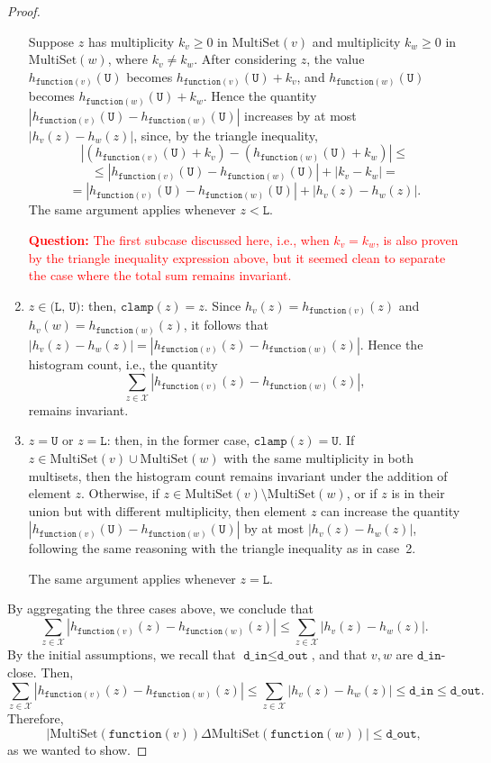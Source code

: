 \documentclass[11pt,a4paper]{article}
\theoremstyle{definition}
\newcommand{\MultiSet}{\mathrm{MultiSet}}
\newcommand{\din}{\texttt{d\_in}}
\newcommand{\dout}{\texttt{d\_out}}
\newcommand{\clamp}{\texttt{clamp}}
\newcommand{\function}{\texttt{function}}
\newcommand{\questionc}[1]{\textcolor{red}{\textbf{Question:} #1}}
\newcommand{\silvia}[1]{{ {\color{blue}{(silvia)~#1}}}}
\begin{document}
\begin{proof}
\begin{enumerate}
    Suppose $z$ has multiplicity $k_v \geq 0$ in $\MultiSet(v)$ and multiplicity $k_w \geq 0$ in $\MultiSet(w)$, where $k_v \neq k_w$. After considering $z$, the value $h_{\function(v)}(\texttt{U})$ becomes $h_{\function(v)}(\texttt{U}) + k_v$, and $h_{\function(w)}(\texttt{U})$ becomes $h_{\function(w)}(\texttt{U}) + k_w$. Hence the quantity $|h_{\function(v)}(\texttt{U}) - h_{\function(w)}(\texttt{U})|$ increases by at most $|h_v(z) - h_w(z)|$, since, by the triangle inequality,
    \[
         |(h_{\function(v)}(\texttt{U}) + k_v) - (h_{\function(w)}(\texttt{U}) + k_w)| \leq
    \]
    \[
         \leq |h_{\function(v)}(\texttt{U}) - h_{\function(w)}(\texttt{U})| + |k_v - k_w| =
    \]
    \[
        = |h_{\function(v)}(\texttt{U}) - h_{\function(w)}(\texttt{U})| + |h_v(z) - h_w(z)|.
    \]
    The same argument applies whenever $z < \texttt{L}$. 
    
    \questionc{The first subcase discussed here, i.e., when $k_v = k_w$, is also proven by the triangle inequality expression above, but it seemed clean to separate the case where the total sum remains invariant.}
    
    \item $z \in \texttt{(L, U)}$: then, $\clamp(z) = z$. Since $h_v(z) = h_{\function(v)}(z)$ and $h_v(w) = h_{\function(w)}(z)$, it follows that $|h_v(z) - h_w(z)| = |h_{\function(v)}(z) - h_{\function(w)}(z)|$. Hence the histogram count, i.e., the quantity
     \[
        \sum_{z \in \mathcal{X}} |h_{\function(v)}(z) - h_{\function(w)}(z)|,
    \]
    remains invariant.
    
    \item $z = \texttt{U}$ or $z = \texttt{L}$: then, in the former case, $\clamp(z) = \texttt{U}$. If $z \in \MultiSet(v) \cup \MultiSet(w)$ with the same multiplicity in both multisets, then the histogram count remains invariant under the addition of element $z$. Otherwise, if $z \in \MultiSet(v) \setminus \MultiSet(w)$, or if $z$ is in their union but with different multiplicity, then element $z$ can increase the quantity $|h_{\function(v)}(\texttt{U}) - h_{\function(w)}(\texttt{U})|$ by at most $|h_v(z)-h_w(z)|$, following the same reasoning with the triangle inequality as in case~2.
    
    The same argument applies whenever $z = \texttt{L}$.
\end{enumerate}

By aggregating the three cases above, we conclude that
\[
\sum_{z \in \mathcal{X}} |h_{\function(v)}(z) - h_{\function(w)}(z)| \leq \sum_{z \in \mathcal{X}} |h_v(z) - h_w(z)|.
\]
By the initial assumptions, we recall that $\din \leq \dout$, and that $v, w$ are $\din$-close. Then,
\[
\sum_{z \in \mathcal{X}} |h_{\function(v)}(z) - h_{\function(w)}(z)| \leq \sum_{z \in \mathcal{X}} |h_v(z) - h_w(z)| \leq \din \leq \dout.
\]
Therefore, 
\[
|\MultiSet(\function(v)) \Delta \MultiSet(\function(w))| \leq \dout,
\]
as we wanted to show.
\end{proof}

\silvia{Flag: will change to the simplified general proof scheme that Prof. Vadhan suggested in the Git repo once we have finished adding the row-by-row transform lemmas in the proof definitions document.}
\end{document}
